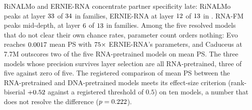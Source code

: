 \documentclass[11pt]{article}
\begin{document}
RiNALMo and ERNIE-RNA concentrate partner specificity late: RiNALMo peaks at layer
$33{}$ of $34{}$ in \psPeakCountRiNALMo{} families,
ERNIE-RNA at layer $12{}$ of $13{}$ in
\psPeakCountErnieRNA{}. RNA-FM peaks mid-depth, at layer $6{}$ of
$13{}$ in \psPeakCountRNAFM{} families. Among the five resolved
models that do not clear their own chance rates, parameter count orders
nothing: Evo reaches $0.0017{}$ mean PS with $75{}\times$
ERNIE-RNA's parameters, and Caduceus at 7.7M outscores two of the five
RNA-pretrained models on mean PS. The three models whose precision survives
layer selection are all RNA-pretrained, three of five against zero of five. The
registered comparison of mean PS between the RNA-pretrained and DNA-pretrained
models meets its effect-size criterion (rank-biserial $+0.52{}$
against a registered threshold of $0.5$) on ten models, a number that does not
resolve the difference ($p = 0.222{}$).
\end{document}
